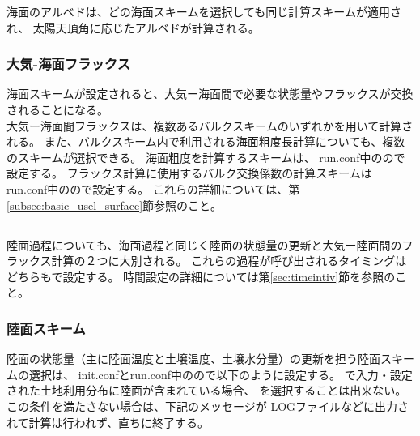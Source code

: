 海面のアルベドは、どの海面スキームを選択しても同じ計算スキームが適用され、
太陽天頂角に応じたアルベドが計算される。\\


\subsubsection{大気-海面フラックス}
海面スキームが設定されると、大気ー海面間で必要な状態量やフラックスが交換されることになる。\\
大気ー海面間フラックスは、複数あるバルクスキームのいずれかを用いて計算される。
また、バルクスキーム内で利用される海面粗度長計算についても、複数のスキームが選択できる。
海面粗度を計算するスキームは、
run.conf中のので設定する。
フラックス計算に使用するバルク交換係数の計算スキームは
run.conf中のので設定する。
これらの詳細については、第\ref{subsec:basic_usel_surface}節参照のこと。\\



\subsection{\SubsecLandSetting} \label{subsec:basic_usel_land}
陸面過程についても、海面過程と同じく陸面の状態量の更新と大気ー陸面間のフラックス計算の２つに大別される。
これらの過程が呼び出されるタイミングはどちらもで設定する。
時間設定の詳細については第\ref{sec:timeintiv}節を参照のこと。\\


\subsubsection{陸面スキーム}
陸面の状態量（主に陸面温度と土壌温度、土壌水分量）の更新を担う陸面スキームの選択は、
init.confとrun.conf中のので以下のように設定する。
で入力・設定された土地利用分布に陸面が含まれている場合、
を選択することは出来ない。この条件を満たさない場合は、下記のメッセージが
LOGファイルなどに出力されて計算は行われず、直ちに終了する。

\\

